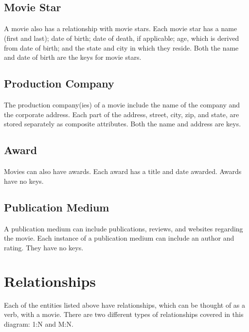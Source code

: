 \documentclass[12pt]{article}
\begin{document}
\subsection{Movie Star}
\paragraph{}A movie also has a relationship with movie stars. Each movie star has a name (first and last); date of birth; date of death, if applicable; age, which is derived from date of birth; and the state and city in which they reside. Both the name and date of birth are the keys for movie stars.
\subsection{Production Company}
\paragraph{}The production company(ies) of a movie include the name of the company and the corporate address. Each part of the address, street, city, zip, and state, are stored separately as composite attributes. Both the name and address are keys.
\subsection{Award}
\paragraph{}Movies can also have awards. Each award has a title and date awarded. Awards have no keys.
\subsection{Publication Medium}
\paragraph{} A publication medium can include publications, reviews, and websites regarding the movie. Each instance of a publication medium can include an author and rating. They have no keys.
\section{Relationships}
\paragraph{} Each of the entities listed above have relationships, which can be thought of as a verb, with a movie. There are two different types of relationships covered in this diagram: 1:N and M:N.
\end{document}
